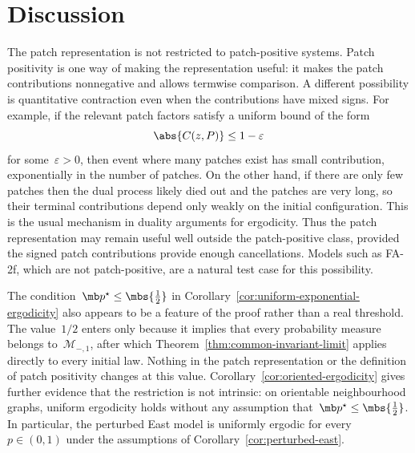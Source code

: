 
\section{Discussion}
\label{sec:discussion}

The patch representation is not restricted to patch-positive systems. Patch
positivity is one way of making the representation useful: it makes the patch
contributions nonnegative and allows termwise comparison. A different
possibility is quantitative contraction even when the contributions have mixed
signs. For example, if the relevant patch factors satisfy a uniform bound of
the form
\begin{equation*}
\abs{C(z,P)}
\leq
1-\varepsilon
\end{equation*}
for some~$\varepsilon>0$, then event where many patches exist has small contribution, exponentially in the number of patches. On the other hand,
if there are only few patches then the dual process likely died out and the patches are very long, so their terminal contributions depend only weakly on the initial configuration. This is the usual mechanism in duality arguments for ergodicity. Thus the patch representation may remain useful well
outside the patch-positive class, provided the signed patch contributions provide enough cancellations. Models such as
FA-2f, which are not patch-positive, are a natural test case for this
possibility.

The condition~$\mb p^\star\leq\mbs{\tfrac12}$ in
Corollary~\ref{cor:uniform-exponential-ergodicity} also appears to be a
feature of the proof rather than a real threshold. The value~$1/2$ enters
only because it implies that every probability measure belongs to~$\mathcal M_{-,1}$, after which Theorem~\ref{thm:common-invariant-limit}
applies directly to every initial law. Nothing in the patch representation or
the definition of patch positivity changes at this value. Corollary~\ref{cor:oriented-ergodicity} gives further evidence that the restriction is
not intrinsic: on orientable neighbourhood graphs, uniform ergodicity holds
without any assumption that~$\mb p^\star\leq\mbs{\tfrac12}$. In
particular, the perturbed East model is uniformly ergodic for every~$p\in(0,1)$ under the assumptions of Corollary~\ref{cor:perturbed-east}.

